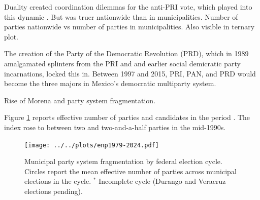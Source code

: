 \documentclass[letter,12pt]{article}
\begin{document}
Duality created coordination dilemmas for the anti-PRI vote, which played into this dynamic \citep{magaloni.2006}. But was truer nationwide than in municipalities. Number of parties nationwide vs number of parties in municipalities. Also visible in ternary plot. 

The creation of the Party of the Democratic Revolution (PRD), which in 1989 amalgamated splinters from the PRI and and earlier social demicratic party incarnations, locked this in. Between 1997 and 2015, PRI, PAN, and PRD would become the three majors in Mexico's democratic multiparty system. 


Rise of Morena and party system fragmentation.

Figure \ref{F:enp} reports effective number of parties and candidates in the period \citep{laakso.taagepera.1979}. The index rose to between two and two-and-a-half parties in the mid-1990s.  

\begin{figure}
  \texttt{[image: ../../plots/enp1979-2024.pdf]}
  \caption{Municipal party system fragmentation by federal election cycle. Circles report the mean effective number of parties across municipal elections in the cycle. $^*$ Incomplete cycle (Durango and Veracruz elections pending).}\label{F:enp}
\end{figure}
\end{document}

